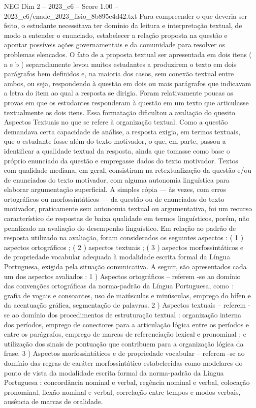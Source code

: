 \begin{textsample}{NEG Dim 2 – 2023\_c6 – Score 1.00 – 2023\_c6/enade\_2023\_fisio\_8b895e4d42.txt}
Para compreender o que deveria ser feito, o estudante necessitava ter domínio da leitura e interpretação textual, de modo a entender o enunciado, estabelecer a relação proposta na questão e apontar possíveis ações governamentais e da comunidade para resolver os problemas elencados.
O fato de a proposta textual ser apresentada em dois itens ( a e b ) separadamente levou muitos estudantes a produzirem o texto em dois parágrafos bem definidos e, na maioria dos casos, sem conexão textual entre ambos, ou seja, respondendo à questão em dois ou mais parágrafos que indicavam a letra do item ao qual a resposta se dirigia.
Foram relativamente poucas as provas em que os estudantes responderam à questão em um texto que articulasse textualmente os dois itens.
Essa formatação dificultou a avaliação do quesito Aspectos Textuais no que se refere à organização textual.
Como a questão demandava certa capacidade de análise, a resposta exigia, em termos textuais, que o estudante fosse além do texto motivador, o que, em parte, passou a identificar a qualidade textual da resposta, ainda que tomasse como base o próprio enunciado da questão e empregasse dados do texto motivador.
Textos com qualidade mediana, em geral, consistiram na retextualização da questão e/ou de enunciados do texto motivador, com alguma autonomia linguística para elaborar argumentação superficial.
A simples cópia — às vezes, com erros ortográficos ou morfossintáticos — da questão ou de enunciados do texto motivador, praticamente sem autonomia textual ou argumentativa, foi um recurso característico de respostas de baixa qualidade em termos linguísticos, porém, não penalizado na avaliação do desempenho linguístico.
Em relação ao padrão de resposta utilizado na avaliação, foram considerados os seguintes aspectos : ( 1 ) aspectos ortográficos ; ( 2 ) aspectos textuais ; ( 3 ) aspectos morfossintáticos e de propriedade vocabular adequada à modalidade escrita formal da Língua Portuguesa, exigida pela situação comunicativa.
A seguir, são apresentados cada um dos aspectos avaliados : 1 ) Aspectos ortográficos – referem -se ao domínio das convenções ortográficas da norma-padrão da Língua Portuguesa, como : grafia de vogais e consoantes, uso de maiúsculas e minúsculas, emprego do hífen e da acentuação gráfica, segmentação de palavras. 2 ) Aspectos textuais – referem -se ao domínio dos procedimentos de estruturação textual : organização interna dos períodos, emprego de conectores para a articulação lógica entre os períodos e entre os parágrafos, emprego de marcas de referenciação lexical e pronominal ; e utilização dos sinais de pontuação que contribuem para a organização lógica da frase. 3 ) Aspectos morfossintáticos e de propriedade vocabular – referem -se ao domínio das regras de caráter morfossintático estabelecidas como modelares do ponto de vista da modalidade escrita formal da norma-padrão da Língua Portuguesa : concordância nominal e verbal, regência nominal e verbal, colocação pronominal, flexão nominal e verbal, correlação entre tempos e modos verbais, ausência de marcas de oralidade.

\end{textsample}
